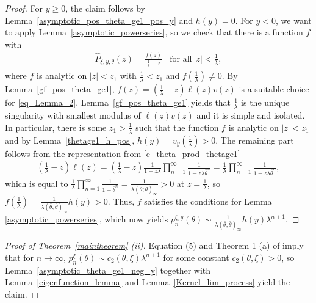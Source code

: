 \documentclass[12pt]{article}
\newcommand{\1}{\mathds{1}}
\theoremstyle{definition}
\theoremstyle{plain}
\theoremstyle{remark}
\begin{document}
\begin{proof}
   For $y\ge0$, the claim follows by Lemma~\ref{asymptotic_pos_theta_ge1_pos_y} and $h(y)=0$. For $y<0$, we want to apply Lemma~\ref{asymptotic_powerseries}, so we check that there is a function $f$ with
    \begin{align}
        \hat{P}_{\xi,y,\theta}(z)=\frac{f(z)}{\frac{1}{\lambda}-z}~~~~\text{for all}~|z|<\frac{1}{\lambda}\label{eq_Lemma_2},
    \end{align}
   where $f$ is analytic on $|z|<z_1$ with $\frac{1}{\lambda}<z_1$ and $f\left(\frac{1}{\lambda}\right)\neq 0$. 
   By Lemma~\ref{gf_pos_theta_ge1}, $f(z)=\left(\frac{1}{\lambda}-z\right)\ell(z)v(z)$  is a suitable choice for \eqref{eq_Lemma_2}. Lemma~\ref{gf_pos_theta_ge1} yields that $\frac{1}{\lambda}$ is the unique singularity with smallest modulus of $\ell(z)v(z)$ and it is simple and isolated. In particular, there is some $z_1>\frac{1}{\lambda}$ such that the function $f$ is analytic on $|z|<z_1$ and by Lemma~\ref{thetage1_h_pos}, $h(y)=v_y\left(\frac{1}{\lambda}\right)>0$. The remaining part follows from the representation from \eqref{e_theta_prod_thetage1}
   \begin{align*}
      \left(\frac{1}{\lambda}-z\right)\ell(z)=\left(\frac{1}{\lambda}-z\right)\frac{1}{1-z\lambda}\prod_{n=1}^\infty\frac{1}{1-z\lambda \bar\theta^n}=\frac{1}{\lambda}\prod_{n=1}^\infty\frac{1}{1-z\lambda \bar\theta^n},
   \end{align*}
   which is equal to $\frac{1}{\lambda}\prod_{n=1}^\infty\frac{1}{1-\bar\theta^n}=\frac{1}{\lambda(\bar\theta;\bar\theta)_\infty}>0$ at $z=\frac{1}{\lambda}$, so $f\left(\frac{1}{\lambda}\right)=\frac{1}{\lambda(\bar\theta;\bar\theta)_\infty}h(y)>0$.
  Thus, $f$ satisfies the  conditions for Lemma \ref{asymptotic_powerseries}, which now yields $p_n^{\xi,y}(\theta)\sim \frac{1}{\lambda(\bar\theta;\bar\theta)_\infty}h(y)\lambda^{n+1}$.
\end{proof}
\begin{proof}[Proof of Theorem~\ref{maintheorem} (ii)]
 Equation (5) and Theorem 1 (a) of \cite{AR}
 imply that for $n\to\infty$, $p_n^{\xi}(\theta)\sim c_2(\theta,\xi)\lambda^{n+1}$ for some constant $c_2(\theta,\xi)>0$,
       so Lemma~\ref{asymptotic_theta_ge1_neg_y} together with Lemma~\ref{eigenfunction_lemma} and Lemma~\ref{Kernel_lim_process} yield the claim.
\end{proof}
\end{document}

